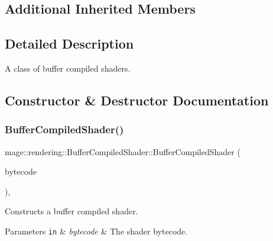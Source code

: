 \subsection*{Additional Inherited Members}


\subsection{Detailed Description}
A class of buffer compiled shaders. 

\subsection{Constructor \& Destructor Documentation}
\hypertarget{classmage_1_1rendering_1_1_buffer_compiled_shader_ae2a2ce1b29d89125d6413ea9bf773694}{}\label{classmage_1_1rendering_1_1_buffer_compiled_shader_ae2a2ce1b29d89125d6413ea9bf773694} 
\subsubsection{\texorpdfstring{Buffer\+Compiled\+Shader()}{BufferCompiledShader()}\hspace{0.1cm}{\footnotesize\ttfamily [1/3]}}
{\footnotesize\ttfamily mage\+::rendering\+::\+Buffer\+Compiled\+Shader\+::\+Buffer\+Compiled\+Shader (\begin{DoxyParamCaption}\item[{gsl\+::span$<$ const B\+Y\+TE $>$}]{bytecode }\end{DoxyParamCaption})\hspace{0.3cm}{\ttfamily [explicit]}, {\ttfamily [noexcept]}}

Constructs a buffer compiled shader.


\begin{DoxyParams}[1]{Parameters}
\mbox{\tt in}  & {\em bytecode} & The shader bytecode. \\
\hline
\end{DoxyParams}
\hypertarget{classmage_1_1rendering_1_1_buffer_compiled_shader_a81aeb002f1a4a11b93f70fbeb34c5afc}{}\label{classmage_1_1rendering_1_1_buffer_compiled_shader_a81aeb002f1a4a11b93f70fbeb34c5afc} 
